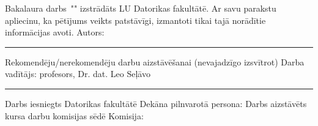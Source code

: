 \documentclass[12pt]{report}%
\theoremstyle{definition}
\def\degree{Bakalaura darbs}
\def\supervisor{Darba vadītājs: profesors, Dr. dat. Leo Seļāvo}
\begin{document}
\cleardoublepage
{}
{}
\printbibliography

%
%


\newpage
\thispagestyle{empty}
\makeatletter
{
\noindent
\degree \ "\@title" izstrādāts LU Datorikas fakultātē.
\newline
\newline
\noindent
Ar savu parakstu apliecinu, ka pētījums veikts patstāvīgi, izmantoti tikai tajā norādītie informācijas avoti.
\newline
\newline
\noindent
Autors: \@author \space \rule{30mm}{0.2mm}
\newline
\newline
\newline
\noindent
Rekomendēju/nerekomendēju darbu aizstāvēšanai (nevajadzīgo izsvītrot)
\newline
\newline
\noindent 
\supervisor \space \rule{30mm}{0.2mm}
\newline
\newline
\newline
\newline
\newline
\noindent 
Darbs iesniegts Datorikas fakultātē
\newline
\newline
\noindent 
Dekāna pilnvarotā persona:
\newline
\newline
\newline
\newline
\noindent 
Darbs aizstāvēts kursa darbu komisijas sēdē
\newline
\newline
\newline
\newline
\newline
\noindent 
Komisija:
}
\makeatother
\end{document}
